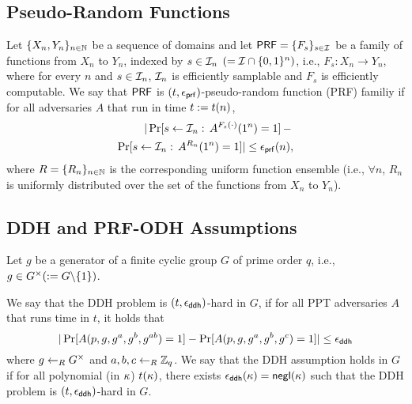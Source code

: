 \subsection{Pseudo-Random Functions} \label{sec:prf}
Let $\{X_n,Y_n\}_{n \in \mathbb{N}}$ be a sequence of domains and let
$\mathsf{PRF} = \{F_{s}\}_{s \in \mathcal{I}}$ be a family of functions
from $X_n$ to $Y_n$, indexed by
$s \in \mathcal{I}_{n}$ $(= \mathcal{I} \cap \{0,1\}^{n})$, i.e.,
$F_{s} : X_n \to Y_n$,
where for every $n$ and $s \in \mathcal{I}_n$,
$\mathcal{I}_n$ is efficiently samplable and  $F_s$ is efficiently computable.
We say that $\mathsf{PRF}$ is $(t,\epsilon_{\mathsf{prf}})$-pseudo-random function (PRF) familiy if
for all adversaries $A$ that run in time $t:= t(n)$,
\begin{eqnarray}
|\Pr[s \gets {\mathcal{I}}_{n}: \, A^{F_s(\cdot)}(1^n)=1] \, - \, \nonumber \\
\Pr[s \gets {\mathcal{I}}_{n}: \, A^{R_n}(1^n)=1] |
\leq \epsilon_{\mathsf{prf}}(n),
\end{eqnarray}
where $R=\{R_n\}_{n\in \mathbb{N}}$ is the corresponding uniform function ensemble
(i.e., $\forall n$, $R_n$ is uniformly distributed over the set of the functions
from $X_n$ to $Y_n$).

\subsection{DDH and PRF-ODH Assumptions} \label{sec:assumption}

Let $g$ be a generator of a finite cyclic group $G$ of prime order $q$, i.e.,
$g \in G^{\times}(:= G\backslash \{1\})$.

\begin{definition}
 We say that the DDH problem is $(t,\epsilon_{\mathsf{ddh}})$-hard in $G$,
if for all PPT adversaries $A$ that runs time in $t$,
 it holds that
 \begin{equation}
  |\Pr[A(p,g,g^a,g^b,g^{ab}) = 1] - \Pr[A(p,g,g^a,g^b,g^c) = 1]| \leq \epsilon_{\mathsf{ddh}}
 \end{equation}
 where $g \getsr G^{\times}$ and $a,b,c \getsr \mathbb{Z}_{q}$.
 We say that the DDH assumption holds in $G$ if for all polynomial (in $\kappa$) $t(\kappa)$,
 there exists $\epsilon_{\mathsf{ddh}}(\kappa)=\mathsf{negl}(\kappa)$
 such that the DDH problem is
 $(t,\epsilon_{\mathsf{ddh}})$-hard in $G$.

\end{definition}

